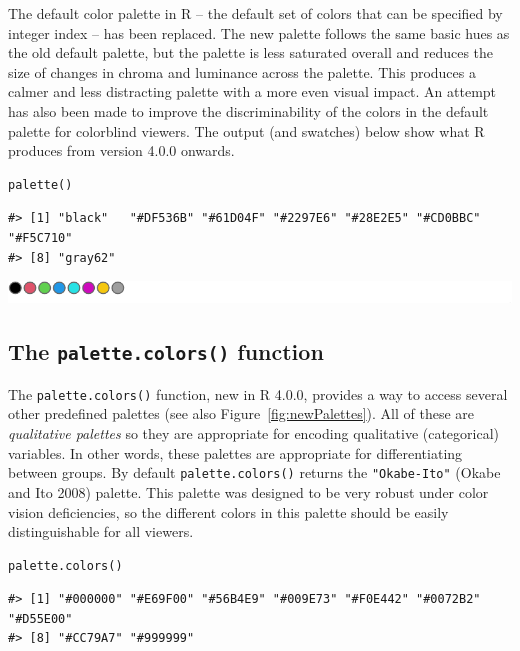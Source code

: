 The default color palette in R -- the default set of colors that can
be specified by integer index -- has been replaced. The new palette
follows the same basic hues as the old default palette, but
the palette is less saturated overall and
reduces the size of changes in chroma and luminance across the palette.
This produces a calmer and less distracting palette with a more
even visual impact.
An attempt has also been made to improve the discriminability
of the colors in the default palette for colorblind viewers.
The output (and swatches) below show what R produces from version 4.0.0
onwards.

\begin{verbatim}
palette()
\end{verbatim}

\begin{verbatim}
#> [1] "black"   "#DF536B" "#61D04F" "#2297E6" "#28E2E5" "#CD0BBC" "#F5C710"
#> [8] "gray62"
\end{verbatim}

\includegraphics[width=1\linewidth]{color_files/figure-latex/R4-1}

\hypertarget{the-palette.colors-function}{%
\subsection{\texorpdfstring{The \texttt{palette.colors()} function}{The palette.colors() function}}\label{the-palette.colors-function}}

The \texttt{palette.colors()} function, new in R 4.0.0, provides a way to
access several other predefined palettes
(see also Figure~\ref{fig:newPalettes}).
All of these are \emph{qualitative palettes} so they are appropriate for
encoding qualitative (categorical) variables. In other words,
these palettes are appropriate for differentiating between groups.
By default \texttt{palette.colors()} returns the
\texttt{"Okabe-Ito"} (Okabe and Ito 2008) palette.
This palette
was designed to be very robust under color vision deficiencies, so
the different colors in this palette should be easily distinguishable
for all viewers.

\begin{verbatim}
palette.colors()
\end{verbatim}

\begin{verbatim}
#> [1] "#000000" "#E69F00" "#56B4E9" "#009E73" "#F0E442" "#0072B2" "#D55E00"
#> [8] "#CC79A7" "#999999"
\end{verbatim}

